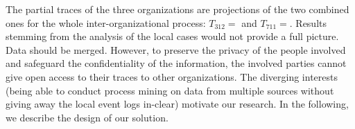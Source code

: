  The partial traces of the three organizations are projections of the two combined ones for the whole inter-organizational process: $T_{312}=$\textlangle{}{\TaliceUncolored}\textrangle{} and $T_{711}=$\textlangle{}{\TbobUncolored}\textrangle{}. %
Results stemming from the analysis of the local cases would not provide a full picture. Data should be merged. However, to preserve the privacy of the people involved and safeguard the confidentiality of the information, the involved parties cannot give open access to their traces to other organizations. The diverging interests (being able to conduct process mining on data from multiple sources without giving away the local event logs in-clear) motivate our research. In the following, we describe the design of our solution.

